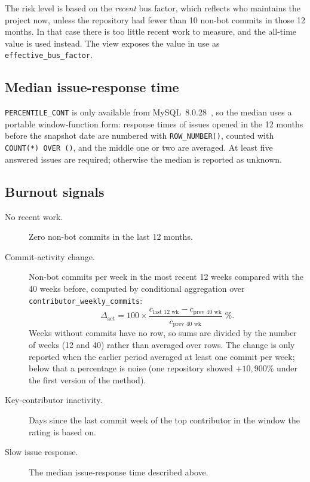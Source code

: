 \documentclass[11pt,a4paper]{report}
\begin{document}
The risk level is based on the \emph{recent} bus factor, which reflects who
maintains the project now, unless the repository had fewer than 10 non-bot
commits in those 12 months. In that case there is too little recent work to
measure, and the all-time value is used instead. The view exposes the value in
use as \texttt{effective\_bus\_factor}.

\subsection{Median issue-response time}

\texttt{PERCENTILE\_CONT} is only available from MySQL~8.0.28~\cite{mysql_manual}, so the
median uses a portable window-function form: response times of issues opened
in the 12 months before the snapshot date are numbered with
\texttt{ROW\_NUMBER()}, counted with \texttt{COUNT(*) OVER ()}, and the middle
one or two are averaged. At least five answered issues are required; otherwise
the median is reported as unknown.

\subsection{Burnout signals}

\begin{description}
  \item[No recent work.] Zero non-bot commits in the last 12 months.
  \item[Commit-activity change.] Non-bot commits per week in the most recent
        12 weeks compared with the 40 weeks before, computed by conditional
        aggregation over \texttt{contributor\_weekly\_commits}:
        \[
          \Delta_{\text{act}} = 100 \times
          \frac{\overline{c}_{\text{last 12 wk}} - \overline{c}_{\text{prev 40 wk}}}
               {\overline{c}_{\text{prev 40 wk}}} \;\%.
        \]
        Weeks without commits have no row, so sums are divided by the number
        of weeks (12 and 40) rather than averaged over rows. The change is only
        reported when the earlier period averaged at least one commit per week;
        below that a percentage is noise (one repository showed $+10{,}900\%$
        under the first version of the method).
  \item[Key-contributor inactivity.] Days since the last commit week of the
        top contributor in the window the rating is based on.
  \item[Slow issue response.] The median issue-response time described above.
\end{description}
\end{document}
